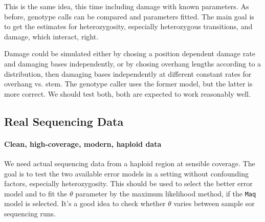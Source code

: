 \documentclass{article}
\begin{document}
This is the same idea, this time including damage with known parameters.
As before, genotype calls can be compared and parameters fitted.  The
main goal is to get the estimates for heterozygosity, especially
heterozygous transitions, and damage, which interact, right.

Damage could be simulated either by chosing a position dependent damage
rate and damaging bases independently, or by chosing overhang lengths
according to a distribution, then damaging bases independently at
different constant rates for overhang vs. stem.  The genotype caller
uses the former model, but the latter is more correct.  We should test
both, both are expected to work reasonably well.





\subsection{Real Sequencing Data}

\paragraph{Clean, high-coverage, modern, haploid data}

We need actual sequencing data from a haploid region at sensible
coverage.  The goal is to test the two available error models in a
setting without confounding factors, especially heterozygosity.  This
should be used to select the better error model and to fit the $\theta$
parameter by the maximum likelihood method, if the \texttt{Maq} model is
selected.  It's a good idea to check whether $\theta$ varies between
sample sor sequencing runs.
\end{document}
